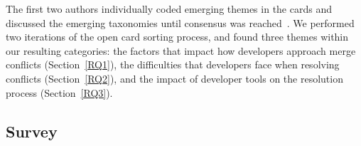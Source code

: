 The first two authors individually coded emerging themes in the cards and discussed the emerging taxonomies until consensus was reached~\cite{card_sort}.
We performed two iterations of the open card sorting process, and found three themes within our resulting categories: the factors that impact how developers approach merge conflicts (Section~\ref{RQ1}), the difficulties that developers face when resolving conflicts (Section~\ref{RQ2}), and the impact of developer tools on the resolution process (Section~\ref{RQ3}).


\subsection{Survey}\label{survey_methods}

